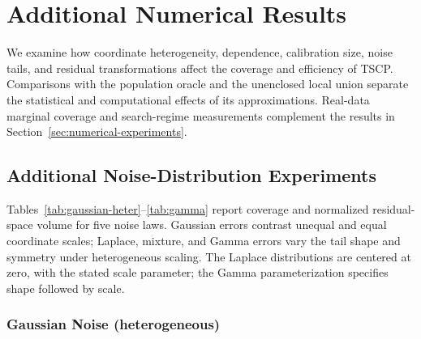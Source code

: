 
\begingroup
\color{blue}
\setlength{\emergencystretch}{2em}

\section{Additional Numerical Results}
\label{app:additional-experiments}

We examine how coordinate heterogeneity, dependence, calibration size, noise
tails, and residual transformations affect the coverage and efficiency of
TSCP. Comparisons with the population oracle and the unenclosed local union
separate the statistical and computational effects of its approximations.
Real-data marginal coverage and search-regime measurements complement the
results in Section~\ref{sec:numerical-experiments}.

\clearpage
\subsection{Additional Noise-Distribution Experiments}
\label{app:additional-distribution-experiments}

Tables~\ref{tab:gaussian-heter}--\ref{tab:gamma} report coverage and
normalized residual-space volume for five noise laws. Gaussian errors
contrast unequal and equal coordinate scales; Laplace, mixture, and Gamma
errors vary the tail shape and symmetry under heterogeneous scaling.
The Laplace distributions are centered at zero, with the stated scale
parameter; the Gamma parameterization specifies shape followed by scale.

\subsubsection*{Gaussian Noise (heterogeneous)}

\begin{table}[H]
    \centering
    
    \caption{Performance of the proposed TSCP method and alternative conformal prediction approaches on simulated data with $d=10$ outcome variables, as in Figure~\ref{fig:gaussian-heter}. All results are averaged over $200$ trials with their one standard deviation reported in parenthesis.  
    The target coverage level is $0.9$. Coverage below this target is highlighted in \textcolor{red}{red}. For volume, lower is better. Smallest volume size (among those with valid theoretical coverage) is highlighted in \textbf{bold}. TSCP yields the tightest volume while maintaining valid coverage.}
    \label{tab:gaussian-heter}
\end{table}

